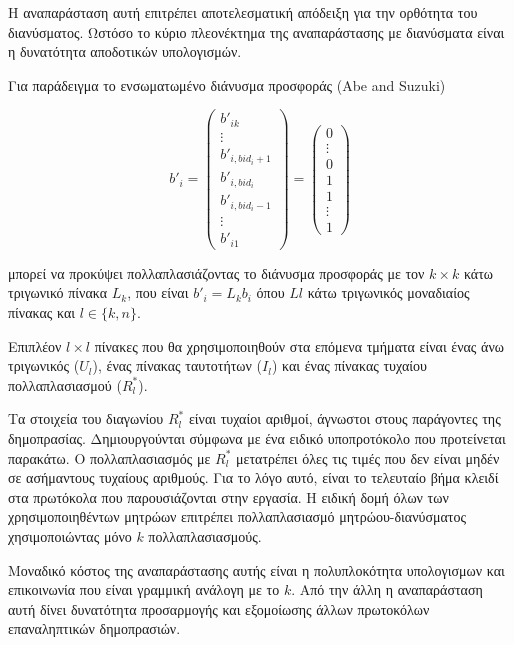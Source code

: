 \documentclass[a4paper,11pt]{article}
\begin{document}
Η αναπαράσταση αυτή επιτρέπει αποτελεσματική απόδειξη για την ορθότητα του διανύσματος. Ωστόσο το κύριο πλεονέκτημα της αναπαράστασης με
διανύσματα είναι η δυνατότητα αποδοτικών υπολογισμών.

Για παράδειγμα το ενσωματωμένο διάνυσμα προσφοράς (Abe and Suzuki)

\begin{displaymath}
	b'_i = 
	\left ( \begin{array}{c}
		b'_{ik}	\\
		\vdots	\\
		b'_{i,bid_i+1} \\
		b'_{i,bid_i}	\\
		b'_{i,bid_i-1} \\
		\vdots \\
		b'_{i1}
	\end{array} \right)
	=
	\left ( \begin{array}{c}
	0	\\
	\vdots \\
	0 \\
	1 \\
	1 \\
	\vdots \\
	1
	\end{array} \right)
\end{displaymath}

μπορεί να προκύψει πολλαπλασιάζοντας το διάνυσμα προσφοράς με τον $k×k$ κάτω τριγωνικό πίνακα $L_k$, που είναι $b'_i=L_kb_i$ 
όπου $Ll$ κάτω τριγωνικός μοναδιαίος πίνακας και $l \in \{k,n\}$.

Επιπλέον $l×l$ πίνακες που θα χρησιμοποιηθούν στα επόμενα τμήματα είναι ένας άνω τριγωνικός ($U_l$), ένας πίνακας ταυτοτήτων ($I_l$) και ένας
πίνακας τυχαίου πολλαπλασιασμού ($R^*_{l}$).

Tα στοιχεία του διαγωνίου $R^*_l$ είναι τυχαίοι αριθμοί, άγνωστοι στους παράγοντες της δημοπρασίας. Δημιουργούνται σύμφωνα με ένα ειδικό
υποπροτόκολο που προτείνεται παρακάτω. Ο πολλαπλασιασμός με $R^*_l$ μετατρέπει όλες τις τιμές που δεν είναι μηδέν σε ασήμαντους τυχαίους αριθμούς.
Για το λόγο αυτό, είναι το τελευταίο βήμα κλειδί στα πρωτόκολα που παρουσιάζονται στην εργασία. Η ειδική δομή όλων των χρησιμοποιηθέντων μητρώων
επιτρέπει πολλαπλασιασμό μητρώου-διανύσματος χησιμοποιώντας μόνο $k$ πολλαπλασιασμούς.

Μοναδικό κόστος της αναπαράστασης αυτής είναι η πολυπλοκότητα υπολογισμων και επικοινωνία που είναι γραμμική ανάλογη με το $k$. Από την άλλη η
αναπαράσταση αυτή δίνει δυνατότητα προσαρμογής και εξομοίωσης άλλων πρωτοκόλων επαναληπτικών δημοπρασιών.
\end{document}
